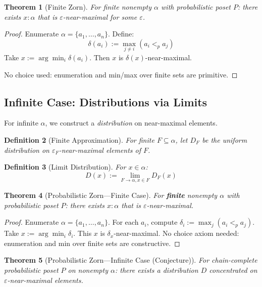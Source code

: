 \documentclass[11pt,a4paper]{article}
\newtheorem{theorem}{Theorem}[section]
\newtheorem{definition}[theorem]{Definition}
\newcommand{\plt}{<_p}
\begin{document}
\begin{theorem}[Finite Zorn]
For finite nonempty $\alpha$ with probabilistic poset $P$: there exists $x : \alpha$ that is $\varepsilon$-near-maximal for some $\varepsilon$.
\end{theorem}

\begin{proof}
Enumerate $\alpha = \{a_1, \ldots, a_n\}$. Define:
\[
\delta(a_i) := \max_{j \neq i} (a_i \plt a_j)
\]
Take $x := \arg\min_i \delta(a_i)$. Then $x$ is $\delta(x)$-near-maximal.

No choice used: enumeration and min/max over finite sets are primitive.
\end{proof}

\subsection{Infinite Case: Distributions via Limits}

For infinite $\alpha$, we construct a \emph{distribution} on near-maximal elements.

\begin{definition}[Finite Approximation]
For finite $F \subseteq \alpha$, let $D_F$ be the uniform distribution on $\varepsilon_F$-near-maximal elements of $F$.
\end{definition}

\begin{definition}[Limit Distribution]
For $x \in \alpha$:
\[
D(x) := \lim_{F \to \alpha, x \in F} D_F(x)
\]
\end{definition}

\begin{theorem}[Probabilistic Zorn---Finite Case]
For \textbf{finite} nonempty $\alpha$ with probabilistic poset $P$: there exists $x : \alpha$ that is $\varepsilon$-near-maximal.
\end{theorem}

\begin{proof}
Enumerate $\alpha = \{a_1, \ldots, a_n\}$. For each $a_i$, compute $\delta_i := \max_j (a_i \plt a_j)$. Take $x := \arg\min_i \delta_i$. This $x$ is $\delta_x$-near-maximal. No choice axiom needed: enumeration and min over finite sets are constructive.
\end{proof}

\begin{theorem}[Probabilistic Zorn---Infinite Case (Conjecture)]
For chain-complete probabilistic poset $P$ on nonempty $\alpha$: there exists a distribution $D$ concentrated on $\varepsilon$-near-maximal elements.
\end{theorem}
\end{document}
